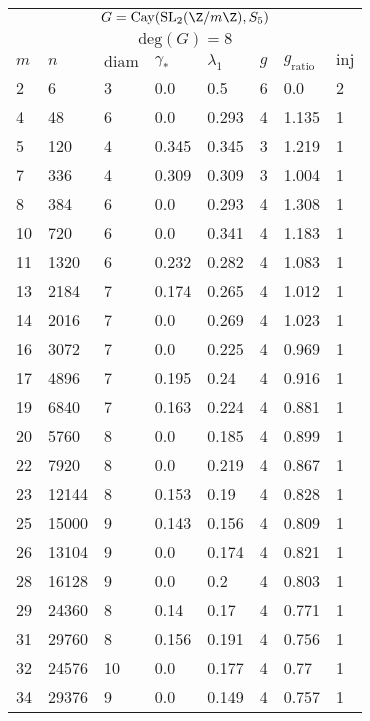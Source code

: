 \begin{center}
	\begin{tabular}{ p{1cm}|p{1cm}|p{1cm}|p{1cm}|p{1cm}|p{1cm}|p{1cm}|p{1cm} }
		\multicolumn{8}{c}{$G = \mathrm{Cay}(\mathrm{SL}_2(\Z/m\Z),S_5)$} \\
		\multicolumn{8}{c}{$\mathrm{deg}(G) = 8$} \\
		\hline
		$m$ & $n$ &  $\mathrm{diam}$ & $\gamma_*$ &  $\lambda_1$ & $g$ & $g_{\mathrm{ratio}}$ & $\mathrm{inj}$     \\
		\hline
		2 & 6 & 3 &  0.0 & 0.5 & 6 & 0.0 & 2 \\
		4 & 48 & 6 &  0.0 & 0.293 & 4 & 1.135 & 1 \\
		5 & 120 & 4 &  0.345 & 0.345 & 3 & 1.219 & 1 \\
		7 & 336 & 4 &  0.309 & 0.309 & 3 & 1.004 & 1 \\
		8 & 384 & 6 &  0.0 & 0.293 & 4 & 1.308 & 1 \\
		10 & 720 & 6 &  0.0 & 0.341 & 4 & 1.183 & 1 \\
		11 & 1320 & 6 &  0.232 & 0.282 & 4 & 1.083 & 1 \\
		13 & 2184 & 7 &  0.174 & 0.265 & 4 & 1.012 & 1 \\
		14 & 2016 & 7 &  0.0 & 0.269 & 4 & 1.023 & 1 \\
		16 & 3072 & 7 &  0.0 & 0.225 & 4 & 0.969 & 1 \\
		17 & 4896 & 7 &  0.195 & 0.24 & 4 & 0.916 & 1 \\
		19 & 6840 & 7 &  0.163 & 0.224 & 4 & 0.881 & 1 \\
		20 & 5760 & 8 &  0.0 & 0.185 & 4 & 0.899 & 1 \\
		22 & 7920 & 8 &  0.0 & 0.219 & 4 & 0.867 & 1 \\
		23 & 12144 & 8 &  0.153 & 0.19 & 4 & 0.828 & 1 \\
		25 & 15000 & 9 &  0.143 & 0.156 & 4 & 0.809 & 1 \\
		26 & 13104 & 9 &  0.0 & 0.174 & 4 & 0.821 & 1 \\
		28 & 16128 & 9 &  0.0 & 0.2 & 4 & 0.803 & 1 \\
		29 & 24360 & 8 &  0.14 & 0.17 & 4 & 0.771 & 1 \\
		31 & 29760 & 8 &  0.156 & 0.191 & 4 & 0.756 & 1 \\
		32 & 24576 & 10 &  0.0 & 0.177 & 4 & 0.77 & 1 \\
		34 & 29376 & 9 &  0.0 & 0.149 & 4 & 0.757 & 1 
	\end{tabular}
\end{center}
\vspace{2em}

